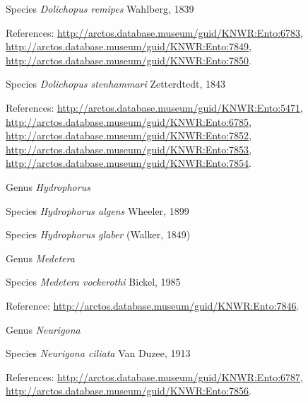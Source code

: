 \documentclass[9pt, article]{memoir}
\begin{document}
\begin{multicols}{2}
\vspace{6pt}\noindent\hspace{36pt}Species \textit{Dolichopus remipes} Wahlberg, 1839


References: 
\url{http://arctos.database.museum/guid/KNWR:Ento:6783}, 
\url{http://arctos.database.museum/guid/KNWR:Ento:7849}, 
\url{http://arctos.database.museum/guid/KNWR:Ento:7850}.

\vspace{6pt}\noindent\hspace{36pt}Species \textit{Dolichopus stenhammari} Zetterdtedt, 1843


References: 
\url{http://arctos.database.museum/guid/KNWR:Ento:5471}, 
\url{http://arctos.database.museum/guid/KNWR:Ento:6785}, 
\url{http://arctos.database.museum/guid/KNWR:Ento:7852}, 
\url{http://arctos.database.museum/guid/KNWR:Ento:7853}, 
\url{http://arctos.database.museum/guid/KNWR:Ento:7854}.

\vspace{6pt}\noindent\hspace{30pt}Genus \textit{Hydrophorus}


\vspace{6pt}\noindent\hspace{36pt}Species \textit{Hydrophorus algens} Wheeler, 1899


\vspace{6pt}\noindent\hspace{36pt}Species \textit{Hydrophorus glaber} (Walker, 1849)


\vspace{6pt}\noindent\hspace{30pt}Genus \textit{Medetera}


\vspace{6pt}\noindent\hspace{36pt}Species \textit{Medetera vockerothi} Bickel, 1985


Reference: 
\url{http://arctos.database.museum/guid/KNWR:Ento:7846}.

\vspace{6pt}\noindent\hspace{30pt}Genus \textit{Neurigona}


\vspace{6pt}\noindent\hspace{36pt}Species \textit{Neurigona ciliata} Van Duzee, 1913


References: 
\url{http://arctos.database.museum/guid/KNWR:Ento:6787}, 
\url{http://arctos.database.museum/guid/KNWR:Ento:7856}.


\end{multicols}
\end{document}

